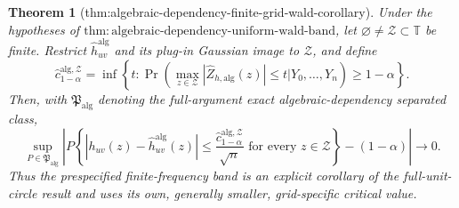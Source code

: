 \documentclass{article}
\newtheorem{theorem}{Theorem}
\begin{document}
\begin{theorem}[thm:algebraic-dependency-finite-grid-wald-corollary]\label{thm:algebraic-dependency-finite-grid-wald-corollary}
Under the hypotheses of \(\mathrm{thm{:}algebraic\mbox{-}dependency\mbox{-}uniform\mbox{-}wald\mbox{-}band}\), let \(\varnothing\ne\mathcal Z\subset\mathbb T\) be finite.  Restrict \(\widehat h_{uv}^{\mathrm{alg}}\) and its plug-in Gaussian image to \(\mathcal Z\), and define
\[
 \widehat c_{1-\alpha}^{\mathrm{alg},\mathcal Z}
 =\inf\left\{t:
 \Pr\!\left(
  \max_{z\in\mathcal Z}|\widehat Z_{h,\mathrm{alg}}(z)|\le t
  \mathrel{\big|}Y_0,\ldots,Y_n
 \right)\ge1-\alpha\right\}.
\]
Then, with \(\mathfrak P_{\mathrm{alg}}\) denoting the full-argument exact algebraic-dependency separated class,
\[
 \sup_{P\in\mathfrak P_{\mathrm{alg}}}
 \left|
 P\!\left\{
  |h_{uv}(z)-\widehat h_{uv}^{\mathrm{alg}}(z)|
  \le\frac{\widehat c_{1-\alpha}^{\mathrm{alg},\mathcal Z}}{\sqrt n}
  \text{ for every }z\in\mathcal Z
 \right\}-(1-\alpha)
 \right|\longrightarrow0.
\]
Thus the prespecified finite-frequency band is an explicit corollary of the full-unit-circle result and uses its own, generally smaller, grid-specific critical value.
\end{theorem}
\end{document}
